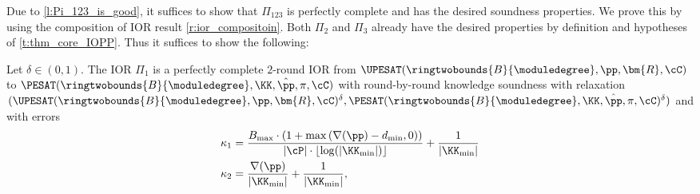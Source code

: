 Due to \cref{l:Pi_123_is_good}, it  suffices to show that $\Pi_{123}$ is perfectly complete and has the desired soundness properties.  We prove this by using the composition of IOR result \cref{r:ior_compositoin}.  Both $\Pi_2$ and $\Pi_3$ already have the desired properties by definition and hypotheses of \cref{t:thm_core_IOPP}. Thus it suffices to show the following:
%
\begin{lemma}\label{l:completeness_soundness_Pi_1}
    Let $\delta\in (0,1)$. The IOR $\Pi_1$ is a perfectly complete $2$-round IOR from $\UPESAT(\ringtwobounds{B}{\moduledegree}, \pp,\bm{R}, \cC)$ to $\PESAT(\ringtwobounds{B}{\moduledegree}, \KK,\hat{\pp}, \pi,  \cC)$ with round-by-round knowledge soundness  with relaxation $(\UPESAT(\ringtwobounds{B}{\moduledegree}, \pp,\bm{R}, \cC)^\delta,\PESAT(\ringtwobounds{B}{\moduledegree}, \KK,\hat{\pp}, \pi,  \cC)^\delta)$ and with errors 
    \begin{align*}
    \kappa_1 &=  \frac{B_{\max}\cdot \left(1+\max\left(\nabla(\pp) - d_{\min},0\right)\right)}{|\cP|\cdot \lfloor\log(|\KK_{\min}|)\rfloor} + \frac{1}{|\KK_{\min}|} \\
    \kappa_2 &= \frac{\nabla(\pp)}{|\KK_{\min}|} + \frac{1}{|\KK_{\min}|},
    \end{align*}
\end{lemma}
